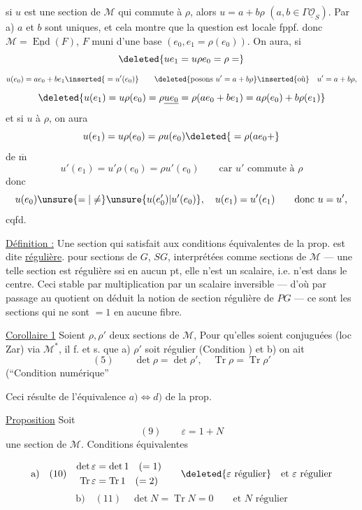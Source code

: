 

si $u$ est une section de $\mathcal M$  qui commute à $\rho$, alors $u=a+b\rho$ $(a,b\in\Gamma\underline{\mathcal O}_S)$. Par a) $a$ et $b$ sont uniques, et cela montre que la question est locale fppf.  donc $\mathcal M=\underline{\operatorname{End}}(F)$, $F$ muni d'une base $(e_0,e_1=\rho(e_0))$.  On aura, si
\[
\deleted{ue_1=u\rho e_0=\rho=}
\]
\[
u(e_0)=ae_0+be_1\inserted{{}=u'(e_0)}\qquad
\deleted{\text{posons }u'=a+b\rho}\inserted{\text{où}}\quad u'=a+b\rho,
\]
\[
\deleted{u(e_1)=u\rho(e_0)=\rho\underline{ue_0}=\rho(ae_0+be_1)=a\rho(e_0)+b\rho(e_1)}
\]
et si $u$   à $\rho$, on aura
\[
u(e_1)=u\rho(e_0)=\rho u(e_0)\deleted{{}=\rho(ae_0+}
\]
de $\overline{\mathrm m}$
\[
u'(e_1)=u'\rho(e_0)=\rho u'(e_0)\qquad\text{car }u'\text{ commute à }\rho
\]
donc
\[
u(e_0)\unsure{=|\neq}\unsure{u(e'_0)|u'(e_0)},\quad u(e_1)=u'(e_1)\qquad\text{donc }u=u',
\]
cqfd.

\uline{Définition :} Une section  qui satisfait aux conditions équivalentes de la prop. est dite \uline{régulière}.  pour sections de $G$, $SG$, interprétées comme sections de $\mathcal M$ ---  une telle section est régulière ssi en aucun pt, elle n'est un scalaire, i.e. n'est dans le centre. Ceci  stable par multiplication par un scalaire inversible --- d'où par passage au quotient on déduit la notion de section régulière de $PG$ --- ce sont les sections qui ne sont $=1$ en aucune fibre.

\uline{Corollaire 1} Soient $\rho,\rho'$ deux sections  de $\mathcal M$,  Pour qu'elles soient conjuguées (loc Zar) via $\mathcal M^*$, il f. et s. que \deleted{$\rho$} a) $\rho'$ soit régulier (Condition  ) et b) on ait
\[
(5)\qquad \det\rho=\det\rho',\quad \operatorname{Tr}\rho=\operatorname{Tr}\rho'
\]
(``Condition numérique''



Ceci résulte de l'équivalence $a)\Longleftrightarrow d)$ de la prop.

\uline{Proposition} Soit
\[
(9)\qquad \varepsilon=1+N
\]
une section de $\mathcal M$. Conditions équivalentes

\[
\text{a)}\quad (10)\quad
\begin{gathered}
\det\varepsilon=\det1\quad(=1)\\
\operatorname{Tr}\varepsilon=\operatorname{Tr}1\quad(=2)
\end{gathered}
\qquad \deleted{\varepsilon\text{ régulier}}\quad\text{et }\varepsilon\text{ régulier}
\]
\[
\text{b)}\quad (11)\quad \det N=\operatorname{Tr}N=0\qquad\text{et }N\text{ régulier}
\]

